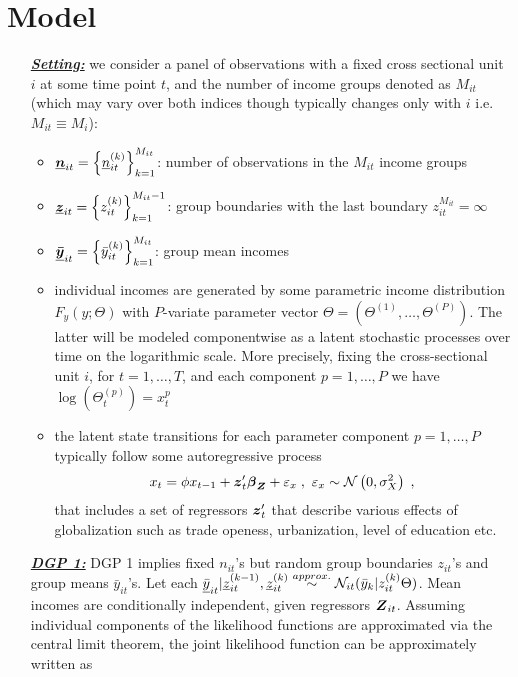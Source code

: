 \section{Model}
\begin{itemize}
\item[\underline{\textbf{\textit{Setting:}}}] we consider a panel of observations with a fixed cross sectional unit $i$ at some time point $t$, and the number of income groups denoted as $M_{it}$ (which may vary over both indices though typically changes only with $i$ i.e. $M_{it}\equiv M_{i}$):
\begin{itemize}
\item $\boldsymbol{\underline{n}}_{it}=\left\{\underline{n}_{it}^{(k)}\right\}_{k = 1}^{M_{it}}$:
number of observations in the $M_{it}$ income groups 
\item $\boldsymbol{\underline{z}}_{it}=\left\{z_{it}^{(k)}\right\}_{k = 1}^{M_{it}-1}$:
group boundaries with the last boundary $z_{it}^{M_{it}}=\infty$
\item $\boldsymbol{\underline{\bar{y}}}_{it}=\left\{\bar{y}_{it}^{(k)}\right\}_{k = 1}^{M_{it}}$:
group mean incomes
\item individual incomes are generated by some parametric income distribution $F_y(y;\Theta)$ with $P$-variate parameter vector $\Theta=(\Theta^{(1)},\ldots,\Theta^{(P)})$. The latter will be modeled componentwise as a latent stochastic processes over time on the logarithmic scale. More precisely, fixing the cross-sectional unit $i$, for $t=1,\ldots,T$, and each component $p=1,\ldots,P$ we have $\log\left(\Theta_t^{(p)}\right)=x^{p}_t$
\item the latent state transitions for each parameter component $p=1,\ldots,P$  typically follow some autoregressive process 
\begin{align*}
x_{t} = \phi x_{t-1}+\boldsymbol{z}^{\prime}_{t}\boldsymbol{\beta}_{\boldsymbol{Z}}+\varepsilon_{x}\;,~\varepsilon_{x}\sim\mathcal{N}\left(0,\sigma_X^2\right)\;,
\end{align*}
that includes a set of regressors $\boldsymbol{z}^{\prime}_{t}$ that describe various effects of globalization such as trade openess, urbanization, level of education etc.
\end{itemize}
%
%
%
%
%
\newpage
\item[\underline{\textbf{\textit{DGP 1:}}}] DGP 1 implies fixed $n_{it}$'s but random group boundaries $z_{it}$'s and group means $\bar{y}_{it}$'s. Let each $\underline{\bar{y}}_{it}\lvert \underline{z}_{it}^{(k-1)},\underline{z}_{it}^{(k)} \overset{approx.}{\sim} \mathcal{N}_{it}(\bar{y}_k\lvert z_{it}^{(k)}\Theta)$. Mean incomes are conditionally independent, given regressors $\boldsymbol{Z}_{it}$. Assuming individual components of the likelihood functions are approximated via the central limit theorem, the joint likelihood function can be approximately written as

\end{itemize}

